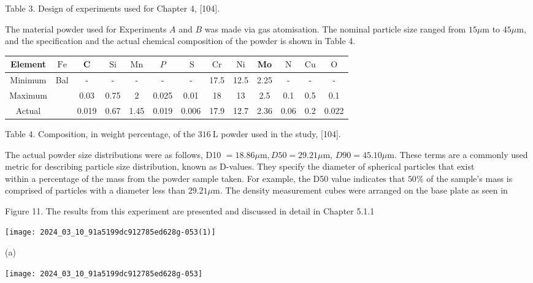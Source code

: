 \documentclass[10pt]{article}
\begin{document}
Table 3. Design of experiments used for Chapter 4, [104].

The material powder used for Experiments $A$ and $B$ was made via gas atomisation. The nominal particle size ranged from $15 \mu \mathrm{m}$ to $45 \mu \mathrm{m}$, and the specification and the actual chemical composition of the powder is shown in Table 4.

\begin{center}
\begin{tabular}{|c|c|c|c|c|c|c|c|c|c|c|c|c|}
\hline
Element & $\mathrm{Fe}$ & C & $\mathrm{Si}$ & $\mathrm{Mn}$ & $P$ & $\mathrm{~S}$ & $\mathrm{Cr}$ & $\mathrm{Ni}$ & Mo & $\mathrm{N}$ & $\mathrm{Cu}$ & $\mathrm{O}$ \\
\hline
Minimum & Bal & - & - & - & - & - & 17.5 & 12.5 & 2.25 & - & - & - \\
\hline
Maximum &  & 0.03 & 0.75 & 2 & 0.025 & 0.01 & 18 & 13 & 2.5 & 0.1 & 0.5 & 0.1 \\
\hline
Actual &  & 0.019 & 0.67 & 1.45 & 0.019 & 0.006 & 17.9 & 12.7 & 2.36 & 0.06 & 0.2 & 0.022 \\
\hline
\end{tabular}
\end{center}

Table 4. Composition, in weight percentage, of the $316 \mathrm{~L}$ powder used in the study, [104].

The actual powder size distributions were as follows, D10 $=18.86 \mu \mathrm{m}, D 50=29.21 \mu \mathrm{m}$, $D 90=45.10 \mu \mathrm{m}$. These terms are a commonly used metric for describing particle size distribution, known as D-values. They specify the diameter of spherical particles that exist\\
within a percentage of the mass from the powder sample taken. For example, the D50 value indicates that $50 \%$ of the sample's mass is comprised of particles with a diameter less than $29.21 \mu \mathrm{m}$. The density measurement cubes were arranged on the base plate as seen in

Figure 11. The results from this experiment are presented and discussed in detail in Chapter 5.1.1

\begin{center}
\texttt{[image: 2024\_03\_10\_91a5199dc912785ed628g-053(1)]}
\end{center}

(a)

\begin{center}
\texttt{[image: 2024\_03\_10\_91a5199dc912785ed628g-053]}
\end{center}
\end{document}
